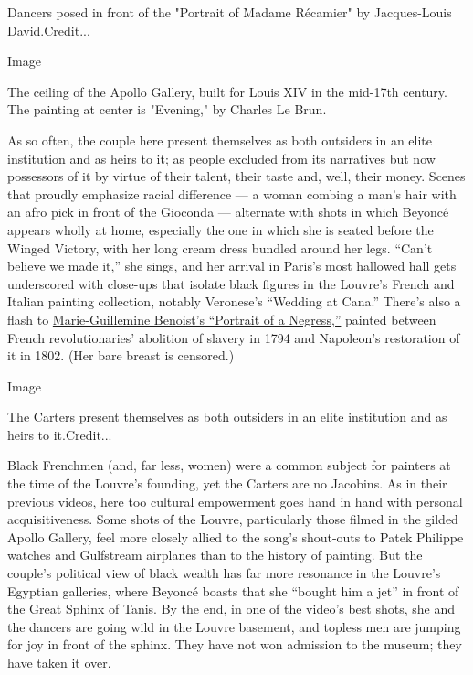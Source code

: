 Dancers posed in front of the "Portrait of Madame Récamier" by
Jacques-Louis David.Credit...

Image

The ceiling of the Apollo Gallery, built for Louis XIV in the mid-17th
century. The painting at center is "Evening," by Charles Le Brun.

As so often, the couple here present themselves as both outsiders in an
elite institution and as heirs to it; as people excluded from its
narratives but now possessors of it by virtue of their talent, their
taste and, well, their money. Scenes that proudly emphasize racial
difference --- a woman combing a man's hair with an afro pick in front
of the Gioconda --- alternate with shots in which Beyoncé appears wholly
at home, especially the one in which she is seated before the Winged
Victory, with her long cream dress bundled around her legs. ``Can't
believe we made it,'' she sings, and her arrival in Paris's most
hallowed hall gets underscored with close-ups that isolate black figures
in the Louvre's French and Italian painting collection, notably
Veronese's ``Wedding at Cana.'' There's also a flash to
\href{https://en.wikipedia.org/wiki/Marie-Guillemine_Benoist}{Marie-Guillemine
Benoist's ``Portrait of a Negress,''} painted between French
revolutionaries' abolition of slavery in 1794 and Napoleon's restoration
of it in 1802. (Her bare breast is censored.)

Image

The Carters present themselves as both outsiders in an elite institution
and as heirs to it.Credit...

Black Frenchmen (and, far less, women) were a common subject for
painters at the time of the Louvre's founding, yet the Carters are no
Jacobins. As in their previous videos, here too cultural empowerment
goes hand in hand with personal acquisitiveness. Some shots of the
Louvre, particularly those filmed in the gilded Apollo Gallery, feel
more closely allied to the song's shout-outs to Patek Philippe watches
and Gulfstream airplanes than to the history of painting. But the
couple's political view of black wealth has far more resonance in the
Louvre's Egyptian galleries, where Beyoncé boasts that she ``bought him
a jet'' in front of the Great Sphinx of Tanis. By the end, in one of the
video's best shots, she and the dancers are going wild in the Louvre
basement, and topless men are jumping for joy in front of the sphinx.
They have not won admission to the museum; they have taken it over.

